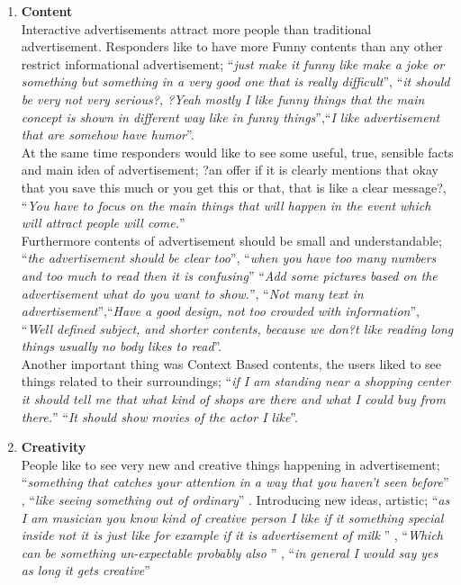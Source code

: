 \begin{enumerate}
\item \textbf{Content} \\
Interactive advertisements attract more people than traditional advertisement.
Responders like to have more Funny contents than any other restrict informational advertisement; ``\emph{just make it funny like make a joke or something but something in a very good one that is really difficult}'', ``\emph{it should be very not very serious?, ?Yeah mostly I like funny things that the main concept is shown in different way like in funny things}'',``\emph{I like advertisement that are somehow have humor}''.\\

At the same time responders would like to see some useful, true, sensible facts and main idea of advertisement; ?an offer if it is clearly mentions that okay that you save this much or you get this or that, that is like a clear message?,  ``\emph{You have to focus on the main things that will happen in the event which will attract people will come.}'' \\

Furthermore contents of advertisement should be small and understandable; ``\emph{the advertisement should be clear too}'', ``\emph{when you have too many numbers and too much to read then it is confusing}'' ``\emph{Add some pictures based on the advertisement what do you want to show.}'', ``\emph{Not many text in advertisement}'',``\emph{Have a good design, not too crowded with information}'', ``\emph{Well defined subject, and shorter contents, because we don?t like reading long things usually no  body likes to read}''.  \\

Another important thing was Context Based contents, the users liked to see things related to their surroundings; ``\emph{if I am standing near a shopping center it should tell me that what kind of shops are there and what I could buy from there.}'' ``\emph{It should show movies of the actor I like}''. \\
		
		
\item \textbf{Creativity} \\	
People like to see very new and creative things happening in advertisement; ``\emph{something that catches your attention in a way that you haven't seen before}'' , ``\emph{like seeing something out of ordinary}'' . Introducing new ideas, artistic; ``\emph{as I am musician you know kind of creative person I like if it something special inside not it is just like for example if it is advertisement of milk }'' , ``\emph{Which can be something un-expectable probably also }'' , ``\emph{in general I would say yes as long it gets creative}'' 



\end{enumerate}

